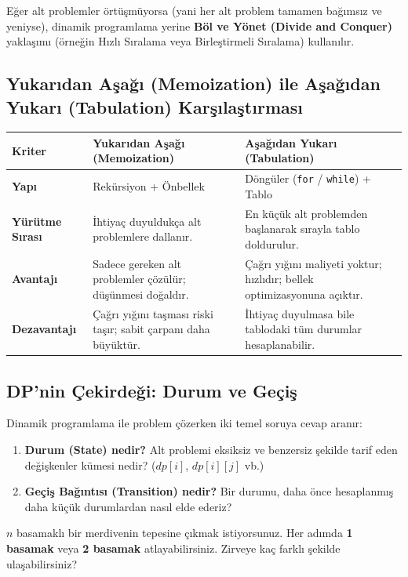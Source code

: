 Eğer alt problemler örtüşmüyorsa (yani her alt problem tamamen bağımsız ve yeniyse), dinamik programlama yerine \textbf{Böl ve Yönet (Divide and Conquer)} yaklaşımı (örneğin Hızlı Sıralama veya Birleştirmeli Sıralama) kullanılır.

\subsection{Yukarıdan Aşağı (Memoization) ile Aşağıdan Yukarı (Tabulation) Karşılaştırması}

\begin{center}
\begin{tabular}{|l|p{4.6cm}|p{4.6cm}|}
\hline
\textbf{Kriter} & \textbf{Yukarıdan Aşağı (Memoization)} & \textbf{Aşağıdan Yukarı (Tabulation)} \\ \hline
\textbf{Yapı} & Rekürsiyon + Önbellek & Döngüler (\texttt{for} / \texttt{while}) + Tablo \\ \hline
\textbf{Yürütme Sırası} & İhtiyaç duyuldukça alt problemlere dallanır. & En küçük alt problemden başlanarak sırayla tablo doldurulur. \\ \hline
\textbf{Avantajı} & Sadece gereken alt problemler çözülür; düşünmesi doğaldır. & Çağrı yığını maliyeti yoktur; hızlıdır; bellek optimizasyonuna açıktır. \\ \hline
\textbf{Dezavantajı} & Çağrı yığını taşması riski taşır; sabit çarpanı daha büyüktür. & İhtiyaç duyulmasa bile tablodaki tüm durumlar hesaplanabilir. \\ \hline
\end{tabular}
\end{center}

\subsection{DP'nin Çekirdeği: Durum ve Geçiş}

Dinamik programlama ile problem çözerken iki temel soruya cevap aranır:
\begin{enumerate}
    \item \textbf{Durum (State) nedir?} Alt problemi eksiksiz ve benzersiz şekilde tarif eden değişkenler kümesi nedir? ($dp[i]$, $dp[i][j]$ vb.)
    \item \textbf{Geçiş Bağıntısı (Transition) nedir?} Bir durumu, daha önce hesaplanmış daha küçük durumlardan nasıl elde ederiz?
\end{enumerate}

\begin{example}
$n$ basamaklı bir merdivenin tepesine çıkmak istiyorsunuz. Her adımda \textbf{1 basamak} veya \textbf{2 basamak} atlayabilirsiniz. Zirveye kaç farklı şekilde ulaşabilirsiniz?
\end{example}

